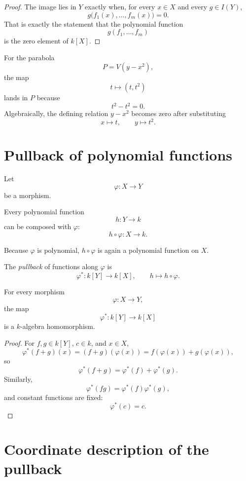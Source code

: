 \begin{proof}
The image lies in \(Y\) exactly when, for every \(x\in X\) and every
\(g\in I(Y)\),
\[
g\bigl(f_1(x),\dots,f_m(x)\bigr)=0.
\]
That is exactly the statement that the polynomial function
\[
g(f_1,\dots,f_m)
\]
is the zero element of \(k[X]\).
\end{proof}

\begin{example}
For the parabola
\[
P=V(y-x^2),
\]
the map
\[
t\longmapsto(t,t^2)
\]
lands in \(P\) because
\[
t^2-t^2=0.
\]
Algebraically, the defining relation \(y-x^2\) becomes zero after substituting
\[
x\mapsto t,\qquad y\mapsto t^2.
\]
\end{example}

\section{Pullback of polynomial functions}

Let
\[
\varphi:X\to Y
\]
be a morphism.

Every polynomial function
\[
h:Y\to k
\]
can be composed with \(\varphi\):
\[
h\circ\varphi:X\to k.
\]

Because \(\varphi\) is polynomial, \(h\circ\varphi\) is again a polynomial function on
\(X\).

\begin{definition}[Pullback]
The \emph{pullback} of functions along \(\varphi\) is
\[
\varphi^\ast:k[Y]\longrightarrow k[X],
\qquad
h\longmapsto h\circ\varphi.
\]
\end{definition}

\begin{proposition}
\label{prop:vi04-pullback-hom}
For every morphism
\[
\varphi:X\to Y,
\]
the map
\[
\varphi^\ast:k[Y]\to k[X]
\]
is a \(k\)-algebra homomorphism.
\end{proposition}

\begin{proof}
For \(f,g\in k[Y]\), \(c\in k\), and \(x\in X\),
\[
\varphi^\ast(f+g)(x)
=
(f+g)(\varphi(x))
=
f(\varphi(x))+g(\varphi(x)),
\]
so
\[
\varphi^\ast(f+g)=\varphi^\ast(f)+\varphi^\ast(g).
\]
Similarly,
\[
\varphi^\ast(fg)=\varphi^\ast(f)\varphi^\ast(g),
\]
and constant functions are fixed:
\[
\varphi^\ast(c)=c.
\]
\end{proof}

\section{Coordinate description of the pullback}

